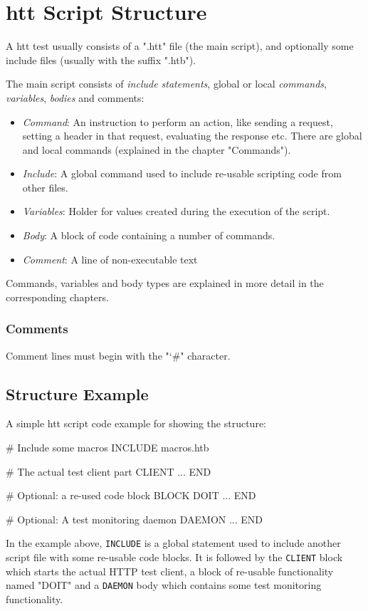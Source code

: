 \chapter{htt Script Structure}
\label{chap:structure}
\begin{flushleft}
A htt test usually consists of a ".htt" file (the main script), and optionally
some include files (usually with the suffix ".htb").

The main script consists of \textit{include statements}, global or local 
\textit{commands}, \textit{variables}, \textit{bodies} and comments:

\begin{itemize}
  \item \textit{Command}: An instruction to perform an action, like sending a request,
          setting a header in that request, evaluating the response etc. There are 
          global and local commands (explained in the chapter "Commands").
  \item \textit{Include}: A global command used to include re-usable scripting code from other files.
  \item \textit{Variables}: Holder for values created during the execution of the script. 
  \item \textit{Body}: A block of code containing a number of commands.
  \item \textit{Comment}: A line of non-executable text
\end{itemize}

Commands, variables and body types are explained in more detail in the corresponding chapters. 

\subsection{Comments}

Comment lines must begin with the "\char`\#" character.

\newpage
\section{Structure Example}

A simple htt script code example for showing the structure:
\end{flushleft}

\begin{usplisting}
    # Include some macros
    INCLUDE macros.htb
    
    # The actual test client part
    CLIENT
       ...
    END
    
    # Optional: a re-used code block
    BLOCK DOIT
       ...
    END
    
    # Optional: A test monitoring daemon
    DAEMON
       ...
    END 
\end{usplisting}

In the example above, \texttt{INCLUDE} is a global statement used to include another 
script file with some re-usable code blocks. It is followed by the \texttt{CLIENT} 
block which starts the actual HTTP test client, a block of re-usable functionality 
named "DOIT" and a \texttt{DAEMON} body which contains some test monitoring functionality.
